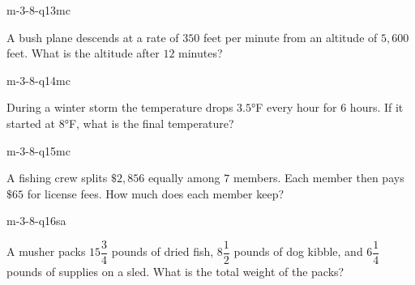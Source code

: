 \begin{practiceQuestion}{m-3-8-q13}{mc}
\begin{questionText}
A bush plane descends at a rate of $350$ feet per minute from an altitude of $5{,}600$ feet. What is the altitude after $12$ minutes?
\end{questionText}
\end{practiceQuestion}

\begin{practiceQuestion}{m-3-8-q14}{mc}
\begin{questionText}
During a winter storm the temperature drops $3.5°$F every hour for $6$ hours. If it started at $8°$F, what is the final temperature?
\end{questionText}
\end{practiceQuestion}

\begin{practiceQuestion}{m-3-8-q15}{mc}
\begin{questionText}
A fishing crew splits $\$2{,}856$ equally among $7$ members. Each member then pays $\$65$ for license fees. How much does each member keep?
\end{questionText}
\end{practiceQuestion}


\begin{practiceQuestion}{m-3-8-q16}{sa}
\begin{questionText}
A musher packs $15\dfrac{3}{4}$ pounds of dried fish, $8\dfrac{1}{2}$ pounds of dog kibble, and $6\dfrac{1}{4}$ pounds of supplies on a sled. What is the total weight of the packs?
\end{questionText}
\end{practiceQuestion}

